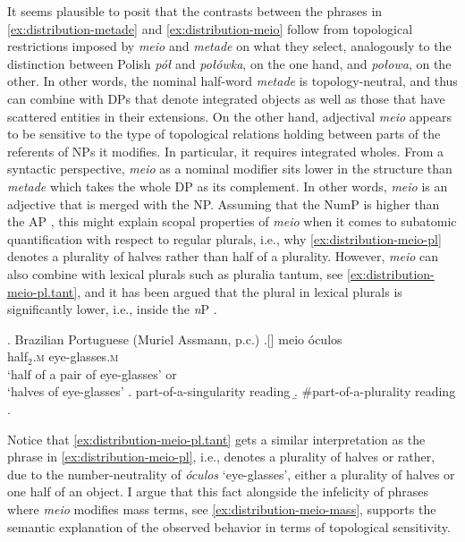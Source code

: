 It seems plausible to posit that the contrasts between the phrases in \ref{ex:distribution-metade} and \ref{ex:distribution-meio} follow from topological restrictions imposed by \textit{meio} and \textit{metade} on what they select, analogously to the distinction between Polish \textit{pół} and \textit{połówka}, on the one hand, and \textit{połowa}, on the other. In other words, the nominal half-word \textit{metade} is topology-neutral, and thus can combine with DPs that denote integrated objects as well as those that have scattered entities in their extensions. On the other hand, adjectival \textit{meio} appears to be sensitive to the type of topological relations holding between parts of the referents of NPs it modifies. In particular, it requires integrated wholes. From a syntactic perspective, \textit{meio} as a nominal modifier sits lower in the structure than \textit{metade} which takes the whole DP as its complement. In other words, \textit{meio} is an adjective that is merged with the NP. Assuming that the NumP is higher than the AP \citep[e.g.,][]{ritter1991two,ritter1992cross}, this might explain scopal properties of \textit{meio} when it comes to subatomic quantification with respect to regular plurals, i.e., why \ref{ex:distribution-meio-pl} denotes a plurality of halves rather than half of a plurality. However, \textit{meio} can also combine with lexical plurals such as pluralia tantum, see \ref{ex:distribution-meio-pl.tant}, and it has been argued that the plural in lexical plurals is significantly lower, i.e., inside the \textit{n}P \citep[see, e.g.,][]{acquaviva2008lexical,alexiadou2011plural,smith2015feature,smith2017lexical}.\largerpage[2]

\ex. Brazilian Portuguese (Muriel Assmann, p.c.)
\bg.[] meio {\'{o}}culos\label{ex:distribution-meio-pl.tant}\\
half$_{2}$\textsc{.m} eye-glasses\textsc{.m}\\
`half of a pair of eye-glasses' or\\
`halves of eye-glasses'
\a. part-of-a-singularity reading
\b. \#part-of-a-plurality reading
\z.

Notice that \ref{ex:distribution-meio-pl.tant} gets a similar interpretation as the phrase in \ref{ex:distribution-meio-pl}, i.e., denotes a plurality of halves or rather, due to the number-neutrality of \textit{{\'{o}}culos} `eye-glasses', either a plurality of halves or one half of an object. I argue that this fact alongside the infelicity of phrases where \textit{meio} modifies mass terms, see \ref{ex:distribution-meio-mass}, supports the semantic explanation of the observed behavior in terms of topological sensitivity.

